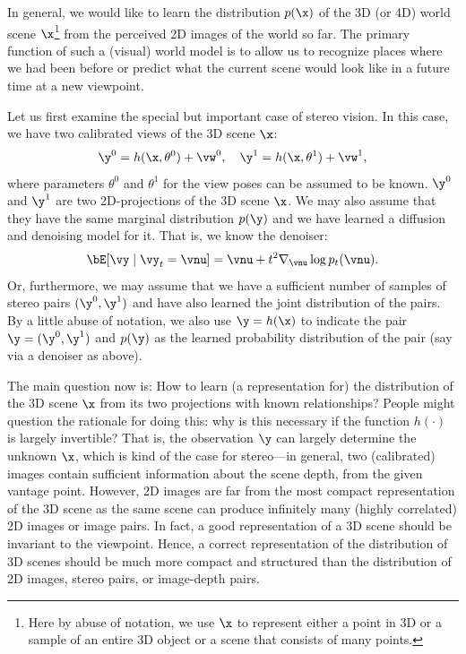 \documentclass[../../book-main.tex]{subfiles}
\begin{document}
In general, we would like to learn the distribution $p(\x)$ of the 3D
(or 4D) world scene $\x$\footnote{Here by abuse of notation, we use
    $\x$ to represent either a point in 3D or a sample of an entire 3D
object or a scene that consists of many points.} from the perceived
2D images of the world so far. The primary function of such a
(visual) world model is to allow us to recognize places where we had
been before or predict what the current scene would look like in a
future time at a new viewpoint.

Let us first examine the special but important case of stereo vision.
In this case, we have two calibrated views of the 3D scene $\x$:
\begin{equation}
    \y^0 = h(\x, \theta^0) +\vw^0, \quad \y^1 = h(\x, \theta^1) +\vw^1,
\end{equation}
where parameters $\theta^0$ and $\theta^1$ for the view poses can be
assumed to be known. $\y^0$ and $\y^1$ are two 2D-projections of the
3D scene $\x$. We may also assume that they have the same marginal
distribution $p(\y)$ and we have learned a diffusion and denoising
model for it. That is, we know the denoiser:
\begin{equation}
    \bE[\vy \mid \vy_t=\vnu] =
    \vnu + t^2 \nabla_{\vnu}\log p_t(\vnu).
    \label{eq:y-posterior-sampling-denoiser}
\end{equation}
Or, furthermore, we may assume that we have a sufficient number of
samples of stereo pairs $(\y^0, \y^1)$ and have also learned the
joint distribution of the pairs. By a little abuse of notation, we
also use $\y = h(\x)$ to indicate the pair $\y = (\y^0, \y^1)$ and
$p(\y)$ as the learned probability distribution of the pair (say via
a denoiser as above).

The main question now is: How to learn (a representation for) the
distribution of the 3D scene $\x$ from its two projections with known
relationships?
People might question the rationale for doing this: why is this
necessary if the function $h(\cdot)$ is largely invertible? That is,
the observation $\y$ can largely determine the unknown $\x$, which is
kind of the case for stereo---in general, two (calibrated) images
contain sufficient information about the scene depth, from the given
vantage point. However, 2D images are far from the most compact
representation of the 3D scene as the same scene can produce
infinitely many (highly correlated) 2D images or image pairs. In
fact, a good representation of a 3D scene should be invariant to the
viewpoint. Hence, a correct representation of the distribution of 3D
scenes should be much more compact and structured than the
distribution of 2D images, stereo pairs, or image-depth pairs.
\end{document}
